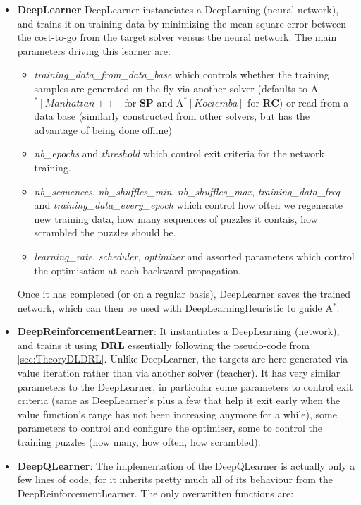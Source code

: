 \begin{itemize}
\item \textbf{DeepLearner} DeepLearner instanciates a DeepLarning (neural network), and trains it on training data by minimizing the mean square error between the cost-to-go from the target solver versus the neural network. The main parameters driving this learner are:
\begin{itemize}
\item \textit{training\_data\_from\_data\_base} which controls whether the training samples are generated on the fly via another solver (defaults to A$^{*}[Manhattan++]$ for \textbf{SP} and A$^{*}[Kociemba]$ for \textbf{RC}) or read from a data base (similarly constructed from other solvers, but has the advantage of being done offline)
\item \textit{nb\_epochs} and \textit{threshold} which control exit criteria for the network training.
\item \textit{nb\_sequences}, \textit{nb\_shuffles\_min}, \textit{nb\_shuffles\_max}, \textit{training\_data\_freq} and \textit{training\_data\_every\_epoch} which control how often we regenerate new training data, how many sequences of puzzles it contais, how scrambled the puzzles should be.
\item \textit{learning\_rate}, \textit{scheduler}, \textit{optimizer} and assorted parameters which control the optimisation at each backward propagation. 
\end{itemize}
Once it has completed (or on a regular basis), DeepLearner saves the trained network, which can then be used with DeepLearningHeuristic to guide A$^{*}$.
\item \textbf{DeepReinforcementLearner}: It instantiates a DeepLearning (network), and trains it using \textbf{DRL} essentially following the pseudo-code from \ref{sec:TheoryDLDRL}. Unlike DeepLearner, the targets are here generated via value iteration rather than via another solver (teacher). It has very similar parameters to the DeepLearner, in particular some parameters to control exit criteria (same as DeepLearner's plus a few that help it exit early when the value function's range has not been increasing anymore for a while), some parameters to control and configure the optimiser, some to control the training puzzles (how many, how often, how scrambled).



\item \textbf{DeepQLearner}: The implementation of the DeepQLearner is actually only a few lines of code, for it inherits pretty much all of its behaviour from the DeepReinforcementLearner. The only overwritten functions are:


\end{itemize}
